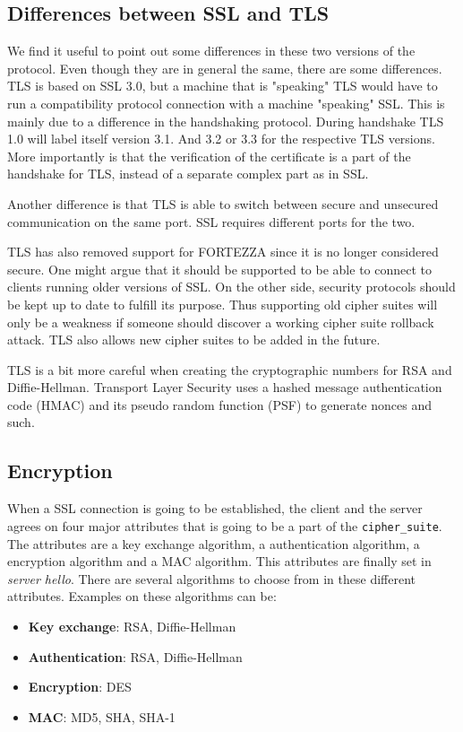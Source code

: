 \documentclass[11pt,a4paper, twocolumn]{article}
\begin{document}
\subsection{Differences between SSL and TLS}
We find it useful to point out some differences in these two versions of the protocol. Even though they are in general the same, there are some differences.
TLS is based on SSL 3.0, but a machine that is "speaking" TLS would have to run a compatibility protocol connection with a machine "speaking" SSL.
This is mainly due to a difference in the handshaking protocol. During handshake TLS 1.0 will label itself version 3.1. And 3.2 or 3.3 for the respective TLS versions. More importantly is that the verification of the certificate is a part of the handshake for TLS, instead of a separate complex part as in SSL.

Another difference is that TLS is able to switch between secure and unsecured communication on the same port. SSL requires different ports for the two.

TLS has also removed support for FORTEZZA since it is no longer considered secure. One might argue that it should be supported to be able to connect to clients running older versions of SSL. On the other side, security protocols should be kept up to date to fulfill its purpose. Thus supporting old cipher suites will only be a weakness if someone should discover a working cipher suite rollback attack. TLS also allows new cipher suites to be added in the future.

TLS is a bit more careful when creating the cryptographic numbers for RSA  and Diffie-Hellman. Transport Layer Security uses a hashed message authentication code (HMAC) and its pseudo random function (PSF) to generate nonces and such.

\subsection{Encryption}
When a SSL connection is going to be established, the client and the server agrees on four major attributes that is going to be a part of the \texttt{cipher\_suite}. The attributes are a key exchange algorithm, a authentication algorithm, a encryption algorithm and a MAC algorithm. This attributes are finally set in \textit{server hello}. There are several algorithms to choose from in these different attributes. Examples on these algorithms can be:
\begin{itemize}
\item{\textbf{Key exchange}: RSA, Diffie-Hellman}
\item{\textbf{Authentication}: RSA, Diffie-Hellman}
\item{\textbf{Encryption}: DES}
\item{\textbf{MAC}: MD5, SHA, SHA-1}
\end{itemize}
\end{document}
